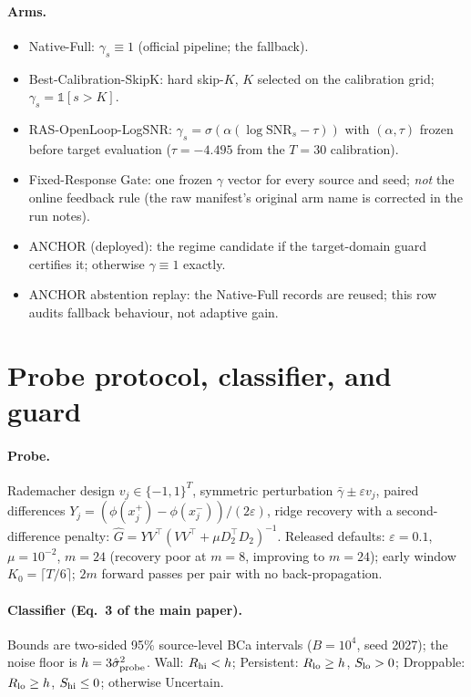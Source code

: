 \documentclass[letterpaper]{article}
\begin{document}
\paragraph{Arms.}
\begin{itemize}
\item Native-Full: $\gamma_s\equiv1$ (official pipeline; the fallback).
\item Best-Calibration-SkipK: hard skip-$K$, $K$ selected on the
  calibration grid; $\gamma_s=\mathbb 1[s>K]$.
\item RAS-OpenLoop-LogSNR: $\gamma_s=\sigma(\alpha(\log\mathrm{SNR}_s-\tau))$
  with $(\alpha,\tau)$ frozen before target evaluation ($\tau{=}-4.495$
  from the $T{=}30$ calibration).
\item Fixed-Response Gate: one frozen $\gamma$ vector for every source
  and seed; \emph{not} the online feedback rule (the raw manifest's
  original arm name is corrected in the run notes).
\item ANCHOR (deployed): the regime candidate if the target-domain
  guard certifies it; otherwise $\gamma\equiv1$ exactly.
\item ANCHOR abstention replay: the Native-Full records are reused; this
  row audits fallback behaviour, not adaptive gain.
\end{itemize}

\section{Probe protocol, classifier, and guard}

\paragraph{Probe.} Rademacher design $v_j\in\{-1,1\}^T$, symmetric
perturbation $\bar\gamma\pm\varepsilon v_j$, paired differences
$Y_j=(\phi(x_j^+)-\phi(x_j^-))/(2\varepsilon)$, ridge recovery with a
second-difference penalty:
$\widehat G=YV^\top(VV^\top+\mu D_2^\top D_2)^{-1}$.
Released defaults: $\varepsilon{=}0.1$, $\mu{=}10^{-2}$, $m{=}24$
(recovery poor at $m{=}8$, improving to $m{=}24$); early window
$K_0=\lceil T/6\rceil$; $2m$ forward passes per pair with no
back-propagation.

\paragraph{Classifier (Eq.~3 of the main paper).} Bounds are two-sided
95\% source-level BCa intervals ($B{=}10^4$, seed 2027); the noise floor
is $h=3\hat\sigma^2_{\rm probe}$. Wall: $R_{\rm hi}<h$; Persistent:
$R_{\rm lo}\ge h$, $S_{\rm lo}>0$; Droppable: $R_{\rm lo}\ge h$,
$S_{\rm hi}\le0$; otherwise Uncertain.
\end{document}
